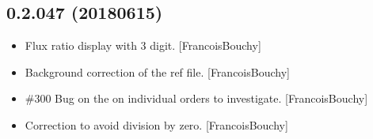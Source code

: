 \documentclass[a4paper,10pt,english]{report}
\begin{document}
\subsection{0.2.047 (2018\sphinxhyphen{}06\sphinxhyphen{}15)}
\label{\detokenize{misc/changelog:id438}}\begin{itemize}
\item {} 
Flux ratio display with 3 digit. {[}FrancoisBouchy{]}

\item {} 
Background correction of the ref file. {[}FrancoisBouchy{]}

\item {} 
\#300 Bug on the  on individual orders to investigate.
{[}FrancoisBouchy{]}

\item {} 
Correction to avoid division by zero. {[}FrancoisBouchy{]}

\end{itemize}
\end{document}
